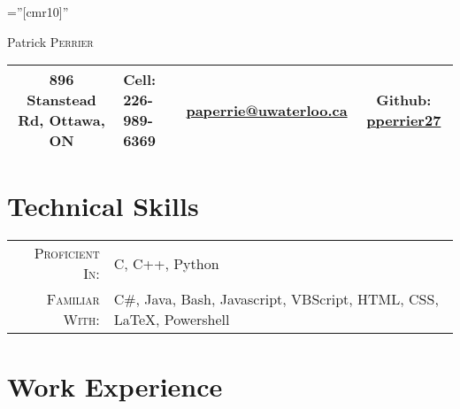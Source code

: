 \documentclass[a4paper,10pt]{article}
\newcommand\Tstrut{\rule{0pt}{2.9ex}}         %
\newcommand\Bstrut{\rule[-1.2ex]{0pt}{0pt}}   %
\newcommand\TBstrut{\Tstrut\Bstrut}           %
\begin{document}
\pagestyle{empty} %

\font\fb=''[cmr10]'' %

\par{\centering
		{\Huge Patrick \textsc{Perrier}
	}\bigskip\par}
\par{
	\begin{tabularx}{\textwidth}{c X X c}
		\hline
		896 Stanstead Rd, Ottawa, ON & Cell: 226-989-6369 
		& \href{mailto:paperrie@uwaterloo.ca}{paperrie@uwaterloo.ca}
		& Github: \href{https://github.com/pperrier27}{pperrier27} \TBstrut \\
		\hline
	\end{tabularx}
}
\section{Technical Skills}

\begin{tabular}{rl}
    \textsc{Proficient In:} & C, C++, Python \\
    \textsc{Familiar With:} & C\#, Java, Bash, Javascript, VBScript, HTML, CSS, \LaTeX, Powershell
\end{tabular}

\section{Work Experience}


\end{document}
